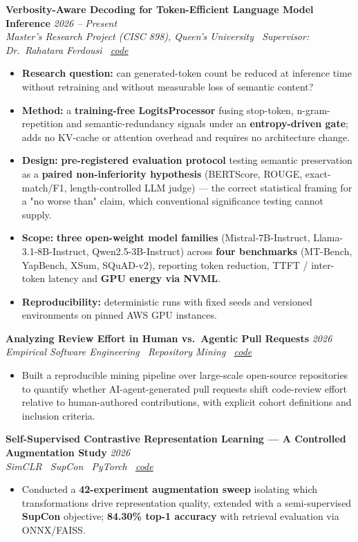 \documentclass[10pt, a4paper]{article}
\newcommand{\cvproject}[3]{%
  \vspace{2.5pt}%
  {\bfseries\color{navy}#1} \hfill {\color{midgray}\textit{#3}}\\[-1.5pt]%
  {\color{teal}\textit{#2}}%
}
\newenvironment{cvitems}{%
  \begin{itemize}[leftmargin=11pt, itemsep=0.5pt, parsep=0pt, topsep=1pt,
                  label={\textcolor{teal}{$\bullet$}}]
}{%
  \end{itemize}%
}
\begin{document}
\cvproject{Verbosity-Aware Decoding for Token-Efficient Language Model Inference}
          {Master's Research Project (CISC 898), Queen's University \textperiodcentered\ Supervisor: Dr.\ Rahatara Ferdousi \textperiodcentered\ \href{https://github.com/MahmoudAlyosify/minimal-lm}{code}}
          {2026 -- Present}
\begin{cvitems}
  \item \textbf{Research question:} can generated-token count be reduced at inference time without retraining and without measurable loss of semantic content?
  \item \textbf{Method:} a \textbf{training-free LogitsProcessor} fusing stop-token, n-gram-repetition and semantic-redundancy signals under an \textbf{entropy-driven gate}; adds no KV-cache or attention overhead and requires no architecture change.
  \item \textbf{Design:} \textbf{pre-registered evaluation protocol} testing semantic preservation as a \textbf{paired non-inferiority hypothesis} (BERTScore, ROUGE, exact-match/F1, length-controlled LLM judge) --- the correct statistical framing for a "no worse than" claim, which conventional significance testing cannot supply.
  \item \textbf{Scope:} \textbf{three open-weight model families} (Mistral-7B-Instruct, Llama-3.1-8B-Instruct, Qwen2.5-3B-Instruct) across \textbf{four benchmarks} (MT-Bench, YapBench, XSum, SQuAD-v2), reporting token reduction, TTFT / inter-token latency and \textbf{GPU energy via NVML}.
  \item \textbf{Reproducibility:} deterministic runs with fixed seeds and versioned environments on pinned AWS GPU instances.
\end{cvitems}

\cvproject{Analyzing Review Effort in Human vs.\ Agentic Pull Requests}
          {Empirical Software Engineering \textperiodcentered\ Repository Mining \textperiodcentered\ \href{https://github.com/MahmoudAlyosify/Analyzing-Review-Effort-in-Human-vs.-Agentic-Pull-Requests}{code}}
          {2026}
\begin{cvitems}
  \item Built a reproducible mining pipeline over large-scale open-source repositories to quantify whether AI-agent-generated pull requests shift code-review effort relative to human-authored contributions, with explicit cohort definitions and inclusion criteria.
\end{cvitems}

\cvproject{Self-Supervised Contrastive Representation Learning --- A Controlled Augmentation Study}
          {SimCLR \textperiodcentered\ SupCon \textperiodcentered\ PyTorch \textperiodcentered\ \href{https://github.com/MahmoudAlyosify/SimCLR-Vision-SSL}{code}}
          {2026}
\begin{cvitems}
  \item Conducted a \textbf{42-experiment augmentation sweep} isolating which transformations drive representation quality, extended with a semi-supervised \textbf{SupCon} objective; \textbf{84.30\% top-1 accuracy} with retrieval evaluation via ONNX/FAISS.
\end{cvitems}
\end{document}
